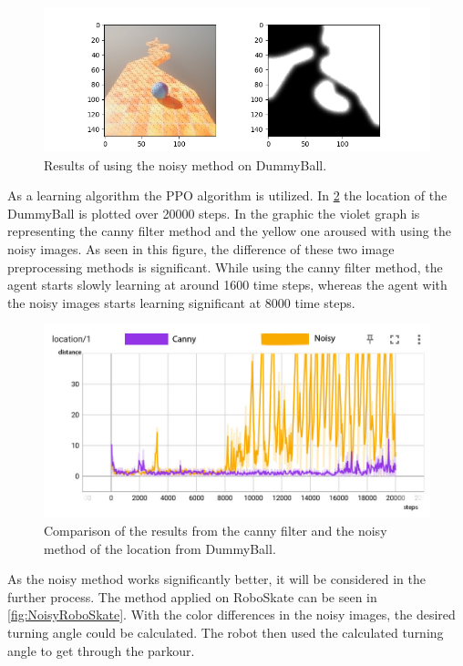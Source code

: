 \documentclass[conference]{IEEEtran}
\begin{document}
\begin{figure}[!t]
\centering
\includegraphics[width = 1.0\linewidth]{images/DummyBall_Noisy.png}
\caption{Results of using the noisy method on DummyBall.}
\label{fig:dummyballnoisy}
\end{figure}

As a learning algorithm the PPO algorithm is utilized. In \figurename  \ref{fig:dummyballresultslocation} the location of the DummyBall is plotted over 20000 steps. In the graphic the violet graph is representing the canny filter method and the yellow one aroused with using the noisy images. As seen in this figure, the difference of these two image preprocessing methods is significant. While using the canny filter method, the agent starts slowly learning at around 1600 time steps, whereas the agent with the noisy images starts learning significant at 8000 time steps. 

\begin{figure}[!t]
\centering
\includegraphics[width = 1.0\linewidth]{images/DummyBall_Results1.jpg}
\caption{Comparison of the results from the canny filter and the noisy method of the location from DummyBall.}
\label{fig:dummyballresultslocation}
\end{figure}

As the noisy method works significantly better, it will be considered in the further process. The method applied on RoboSkate can be seen in \figurename  \ref{fig:NoisyRoboSkate}. With the color differences in the noisy images, the desired turning angle could be calculated. The robot then used the calculated turning angle to get through the parkour. 
\end{document}
